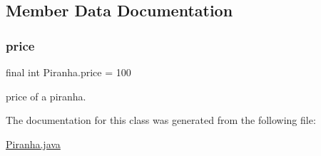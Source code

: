 \subsection{Member Data Documentation}
\mbox{\label{class_piranha_a4df74b901061840159a8b8e0d5e14f88}} 
\subsubsection{\texorpdfstring{price}{price}}
{\footnotesize\ttfamily final int Piranha.\+price = 100\hspace{0.3cm}{\ttfamily [static]}}

price of a piranha. 

The documentation for this class was generated from the following file\+:\begin{DoxyCompactItemize}
\item 
\mbox{\hyperlink{_piranha_8java}{Piranha.\+java}}\end{DoxyCompactItemize}
